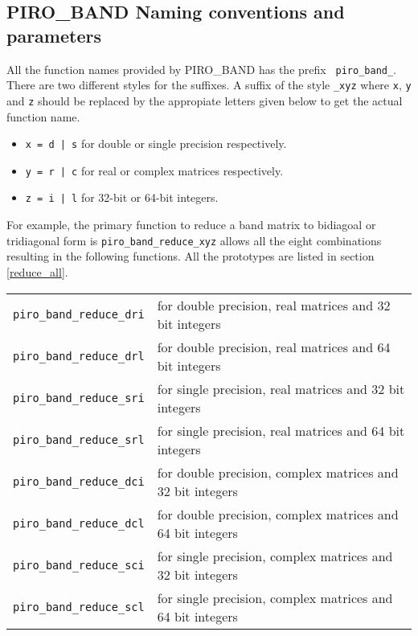 \documentclass[11pt]{article}
\begin{document}
\subsection{PIRO\_BAND Naming conventions and parameters}

All the function names provided by PIRO\_BAND has the prefix {\tt
piro\_band\_}.  There are two different styles for the suffixes. A suffix of
the style {\tt \_xyz} where {\tt x}, {\tt y} and {\tt z} should be replaced by
the appropiate letters given below to get the actual function name. 

\begin{itemize}
\item {\tt x =  d | s} for double or single precision respectively.
\item {\tt y =  r | c} for real or complex matrices respectively.
\item {\tt z =  i | l} for 32-bit or 64-bit integers.
\end{itemize}

For example, the primary function to reduce a band matrix to bidiagoal or 
tridiagonal form is {\tt piro\_band\_reduce\_xyz} allows all the eight
combinations resulting in the following functions. All the prototypes are
listed in section \ref{reduce_all}.

\vspace{0.1in}
\begin{tabular}{ll}
\hline
{\tt piro\_band\_reduce\_dri} & for double precision, real matrices and 32 bit integers \\
{\tt piro\_band\_reduce\_drl} & for double precision, real matrices and 64 bit integers \\
{\tt piro\_band\_reduce\_sri} & for single precision, real matrices and 32 bit integers \\
{\tt piro\_band\_reduce\_srl} & for single precision, real matrices and 64 bit integers \\
{\tt piro\_band\_reduce\_dci} & for double precision, complex matrices and 32 bit integers \\
{\tt piro\_band\_reduce\_dcl} & for double precision, complex matrices and 64 bit integers \\
{\tt piro\_band\_reduce\_sci} & for single precision, complex matrices and 32 bit integers \\
{\tt piro\_band\_reduce\_scl} & for single precision, complex matrices and 64 bit integers \\
\end{tabular}
\end{document}
